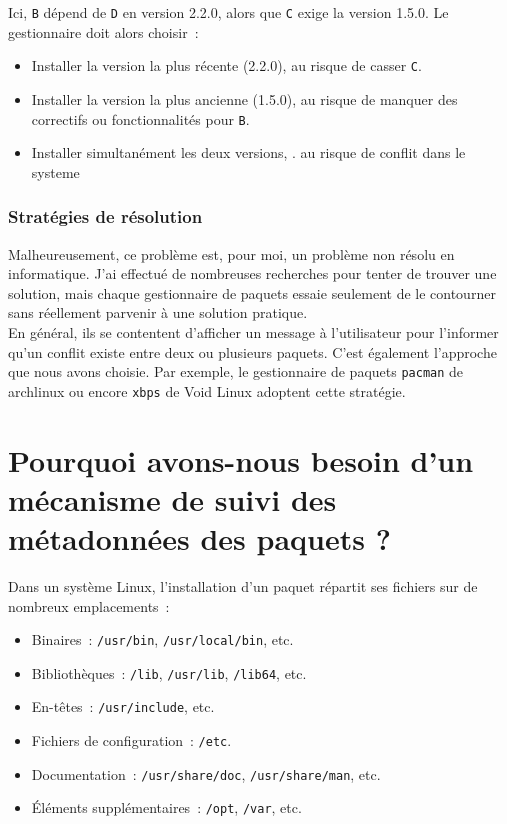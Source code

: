 Ici, \texttt{B} dépend de \texttt{D} en version 2.2.0, alors que \texttt{C} exige la version 1.5.0. Le gestionnaire doit alors choisir :

\begin{itemize}
  \item Installer la version la plus récente (2.2.0), au risque de casser \texttt{C}.
  \item Installer la version la plus ancienne (1.5.0), au risque de manquer des correctifs ou fonctionnalités pour \texttt{B}.
  \item Installer simultanément les deux versions, .  au risque de conflit dans le systeme
\end{itemize}

\subsubsection*{Stratégies de résolution}

Malheureusement, ce problème est, pour moi, un problème non résolu en informatique. J'ai effectué de nombreuses recherches pour tenter de trouver une solution, mais chaque gestionnaire de paquets essaie seulement de le contourner sans réellement parvenir à une solution pratique.\\ En général, ils se contentent d'afficher un message à l'utilisateur pour l'informer qu’un conflit existe entre deux ou plusieurs paquets. C’est également l’approche que nous avons choisie. Par exemple, le gestionnaire de paquets \texttt{pacman} de archlinux ou encore \texttt{xbps} de Void Linux adoptent cette stratégie.




\section{Pourquoi avons-nous besoin d’un mécanisme de suivi des métadonnées des paquets ?}
\label{subsec:suivi-fichiers}

Dans un système Linux, l’installation d’un paquet répartit ses fichiers sur de nombreux emplacements :
\begin{itemize}
  \item Binaires : \texttt{/usr/bin}, \texttt{/usr/local/bin}, etc.  
  \item Bibliothèques : \texttt{/lib}, \texttt{/usr/lib}, \texttt{/lib64}, etc.  
  \item En-têtes : \texttt{/usr/include}, etc.  
  \item Fichiers de configuration : \texttt{/etc}.  
  \item Documentation : \texttt{/usr/share/doc}, \texttt{/usr/share/man}, etc.  
  \item Éléments supplémentaires : \texttt{/opt}, \texttt{/var}, etc.  
\end{itemize}

